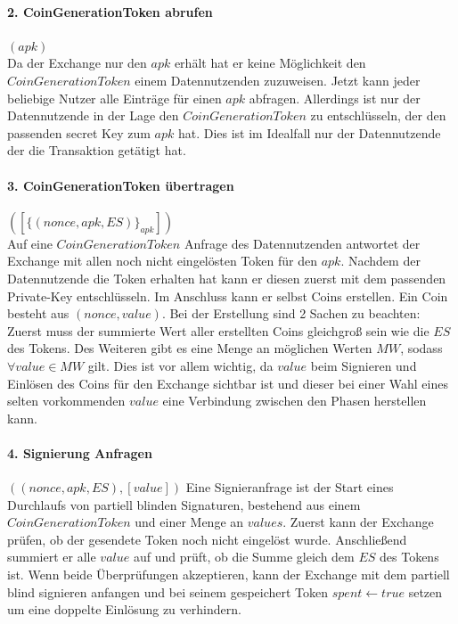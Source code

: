 \documentclass{scrreprt}
\begin{document}
\paragraph{2. CoinGenerationToken abrufen} $(apk)$\\
Da der Exchange nur den $apk$ erhält hat er keine Möglichkeit den $CoinGenerationToken$ einem Datennutzenden zuzuweisen. Jetzt kann jeder beliebige Nutzer alle Einträge für einen $apk$ abfragen. Allerdings ist nur der Datennutzende in der Lage den $CoinGenerationToken$ zu entschlüsseln, der den passenden secret Key zum $apk$ hat. Dies ist im Idealfall nur der Datennutzende der die Transaktion getätigt hat.

\paragraph{3. CoinGenerationToken übertragen} $([\{(nonce, apk, ES)\}_{apk}])$\\
Auf eine $CoinGenerationToken$ Anfrage des Datennutzenden antwortet der Exchange mit allen noch nicht eingelösten Token für den $apk$. Nachdem der Datennutzende die Token erhalten hat kann er diesen zuerst mit dem passenden Private-Key entschlüsseln. Im Anschluss kann er selbst Coins erstellen. Ein Coin besteht aus $(nonce, value)$. Bei der Erstellung sind 2 Sachen zu beachten: Zuerst muss der summierte Wert aller erstellten Coins gleichgroß sein wie die $ES$ des Tokens. Des Weiteren gibt es eine Menge an möglichen Werten $MW$, sodass $\forall value\in MW$ gilt. Dies ist vor allem wichtig, da $value$ beim Signieren und Einlösen des Coins für den Exchange sichtbar ist und dieser bei einer Wahl eines selten vorkommenden $value$ eine Verbindung zwischen den Phasen herstellen kann.

\paragraph{4. Signierung Anfragen} $((nonce, apk, ES), [value])$
Eine Signieranfrage ist der Start eines Durchlaufs von partiell blinden Signaturen, bestehend aus einem $CoinGenerationToken$ und einer Menge an $values$. Zuerst kann der Exchange prüfen, ob der gesendete Token noch nicht eingelöst wurde. Anschließend summiert er alle $value$ auf und prüft, ob die Summe gleich dem $ES$ des Tokens ist. Wenn beide Überprüfungen akzeptieren, kann der Exchange mit dem partiell blind signieren anfangen und bei seinem gespeichert Token $spent \leftarrow true$ setzen um eine doppelte Einlösung zu verhindern.
\end{document}
